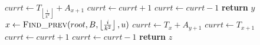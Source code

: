 \documentclass{article}
\begin{document}
    \begin{algorithm}[ht]
    \begin{algorithmic}[1]
                \State $currt\gets T_{\left\lfloor{\frac{i}{k^2}}\right\rfloor}+A_{x+1}$
                        \State $currt\gets currt+1$
                    \EndIf
                        \State $currt\gets currt-1$
                    \EndIf
                        \State \textbf{return} $y$
                    \EndIf
                \EndFor
            \EndIf
        \EndFor
        \State
        \State $x\gets \Call{Find\_prev}{root,B,\left\lfloor{\frac{i}{k^2}}\right\rfloor,u}$ 
                    \State $currt\gets T_x+A_{y+1}$
                \Else
                    \State $currt\gets T_{x+1}$
                \EndIf
                        \State $currt\gets currt+1$
                    \EndIf
                        \State $currt\gets currt-1$
                    \EndIf
                        \State \textbf{return} $z$
                    \EndIf
                \EndFor
            \EndIf
        \EndFor
    \EndProcedure
    \end{algorithmic}
    \end{algorithm}
 
\end{document}
